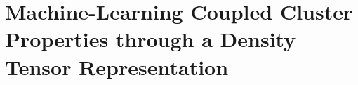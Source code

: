 \chapter{Machine-Learning Coupled Cluster Properties through a Density Tensor Representation} \label{ch:p2}





